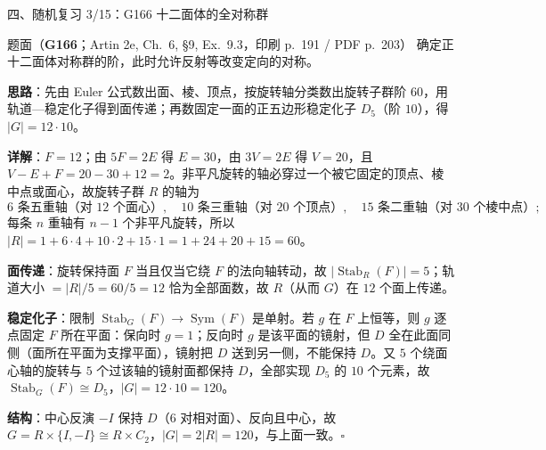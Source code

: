 \documentclass[aspectratio=169,10pt,fontset=none]{ctexbeamer}
\newcommand{\ex}[1]{\textcolor{accent}{\footnotesize\bfseries #1}}
\newcommand{\key}[1]{\textcolor{ink}{\bfseries #1}}
\begin{document}
\begin{frame}[t]{四、随机复习 3/15：G166 十二面体的全对称群}
\label{ex:G166}
\scriptsize
\begin{block}{\footnotesize 题面（\ex{G166}；Artin 2e, Ch.~6, §9, Ex.~9.3，印刷 p.~191 / PDF p.~203）}
确定正十二面体对称群的阶，此时允许反射等改变定向的对称。
\end{block}
\key{思路}：先由 Euler 公式数出面、棱、顶点，按旋转轴分类数出旋转子群阶 $60$，用轨道—稳定化子得到面传递；再数固定一面的正五边形稳定化子 $D_5$（阶 $10$），得 $|G|=12\cdot10$。

\key{详解}：$F=12$；由 $5F=2E$ 得 $E=30$，由 $3V=2E$ 得 $V=20$，且 $V-E+F=20-30+12=2$。非平凡旋转的轴必穿过一个被它固定的顶点、棱中点或面心，故旋转子群 $R$ 的轴为
\[ 6\text{ 条五重轴（对 }12\text{ 个面心）},\quad 10\text{ 条三重轴（对 }20\text{ 个顶点）},\quad 15\text{ 条二重轴（对 }30\text{ 个棱中点）}; \]
每条 $n$ 重轴有 $n-1$ 个非平凡旋转，所以 $|R|=1+6\cdot4+10\cdot2+15\cdot1=1+24+20+15=60$。

\key{面传递}：旋转保持面 $F$ 当且仅当它绕 $F$ 的法向轴转动，故 $|\operatorname{Stab}_R(F)|=5$；轨道大小 $=|R|/5=60/5=12$ 恰为全部面数，故 $R$（从而 $G$）在 $12$ 个面上传递。

\key{稳定化子}：限制 $\operatorname{Stab}_G(F)\to\operatorname{Sym}(F)$ 是单射。若 $g$ 在 $F$ 上恒等，则 $g$ 逐点固定 $F$ 所在平面：保向时 $g=1$；反向时 $g$ 是该平面的镜射，但 $D$ 全在此面同侧（面所在平面为支撑平面），镜射把 $D$ 送到另一侧，不能保持 $D$。又 $5$ 个绕面心轴的旋转与 $5$ 个过该轴的镜射面都保持 $D$，全部实现 $D_5$ 的 $10$ 个元素，故 $\operatorname{Stab}_G(F)\cong D_5$，$|G|=12\cdot10=120$。

\key{结构}：中心反演 $-I$ 保持 $D$（$6$ 对相对面）、反向且中心，故 $G=R\times\{I,-I\}\cong R\times C_2$，$|G|=2|R|=120$，与上面一致。$\square$
\end{frame}
\end{document}
